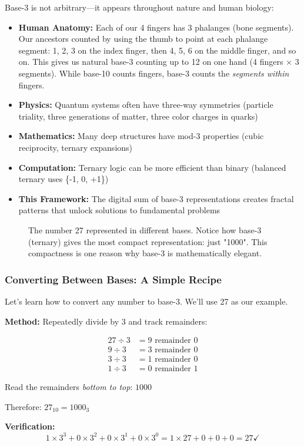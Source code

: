 \begin{keyidea}
Base-3 is not arbitrary—it appears throughout nature and human biology:
\begin{itemize}
\item \textbf{Human Anatomy:} Each of our 4 fingers has 3 phalanges (bone segments). Our ancestors counted by using the thumb to point at each phalange segment: 1, 2, 3 on the index finger, then 4, 5, 6 on the middle finger, and so on. This gives us natural base-3 counting up to 12 on one hand (4 fingers × 3 segments). While base-10 counts fingers, base-3 counts the \textit{segments within} fingers.
\item \textbf{Physics:} Quantum systems often have three-way symmetries (particle triality, three generations of matter, three color charges in quarks)
\item \textbf{Mathematics:} Many deep structures have mod-3 properties (cubic reciprocity, ternary expansions)
\item \textbf{Computation:} Ternary logic can be more efficient than binary (balanced ternary uses \{-1, 0, +1\})
\item \textbf{This Framework:} The digital sum of base-3 representations creates fractal patterns that unlock solutions to fundamental problems
\end{itemize}
\end{keyidea}

\begin{figure}[h]
\centering

\caption{The number 27 represented in different bases. Notice how base-3 (ternary) gives the most compact representation: just "1000". This compactness is one reason why base-3 is mathematically elegant.}
\label{fig:bases}
\end{figure}

\subsubsection*{Converting Between Bases: A Simple Recipe}

Let's learn how to convert any number to base-3. We'll use 27 as our example.

\begin{example}
\textbf{Method:} Repeatedly divide by 3 and track remainders:

\begin{align}
27 ÷ 3 &= 9 \text{ remainder } \boxed{0} \\
9 ÷ 3 &= 3 \text{ remainder } \boxed{0} \\
3 ÷ 3 &= 1 \text{ remainder } \boxed{0} \\
1 ÷ 3 &= 0 \text{ remainder } \boxed{1}
\end{align}

Read the remainders \textit{bottom to top}: $\boxed{1}\boxed{0}\boxed{0}\boxed{0}$

Therefore: $27_{10} = 1000_3$ \checkmark

\textbf{Verification:}
\begin{equation}
1×3^3 + 0×3^2 + 0×3^1 + 0×3^0 = 1×27 + 0 + 0 + 0 = 27 \checkmark
\end{equation}
\end{example}

